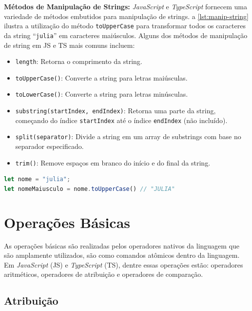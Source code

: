 \textbf{Métodos de Manipulação de Strings:} \textit{JavaScript} e \textit{TypeScript} fornecem uma variedade de métodos embutidos para manipulação de strings. a \autoref{lst:manip-string} ilustra a utilização do método \texttt{toUpperCase} para transformar todos os caracteres da string ``\texttt{julia}'' em caracteres maiúsculos. Alguns dos métodos de manipulação de string em JS e TS mais comuns incluem:

\begin{itemize}
\item \texttt{length}: Retorna o comprimento da string.
\item \texttt{toUpperCase()}: Converte a string para letras maiúsculas.
\item \texttt{toLowerCase()}: Converte a string para letras minúsculas.
\item \texttt{substring(startIndex, endIndex)}: Retorna uma parte da string, começando do índice \texttt{startIndex} até o índice \texttt{endIndex} (não incluído).
\item \texttt{split(separator)}: Divide a string em um array de substrings com base no separador especificado.
\item \texttt{trim()}: Remove espaços em branco do início e do final da string.

\end{itemize}

\begin{lstlisting}[language=TypeScript, caption= Acessando caracteres de strings em JS e TS., label=lst:acesso-caracteres, label=lst:manip-string]
let nome = "julia";
let nomeMaiusculo = nome.toUpperCase() // "JULIA"
\end{lstlisting}


\section{Operações Básicas}
\label{JS_operacoesBasica}

As operações básicas são realizadas pelos operadores nativos da linguagem que são amplamente utilizados, são como comandos atômicos dentro da linguagem. Em \textit{JavaScript} (JS) e \textit{TypeScript} (TS), dentre essas operações estão: operadores aritméticos, operadores de atribuição e operadores de comparação.

\subsection{Atribuição}

